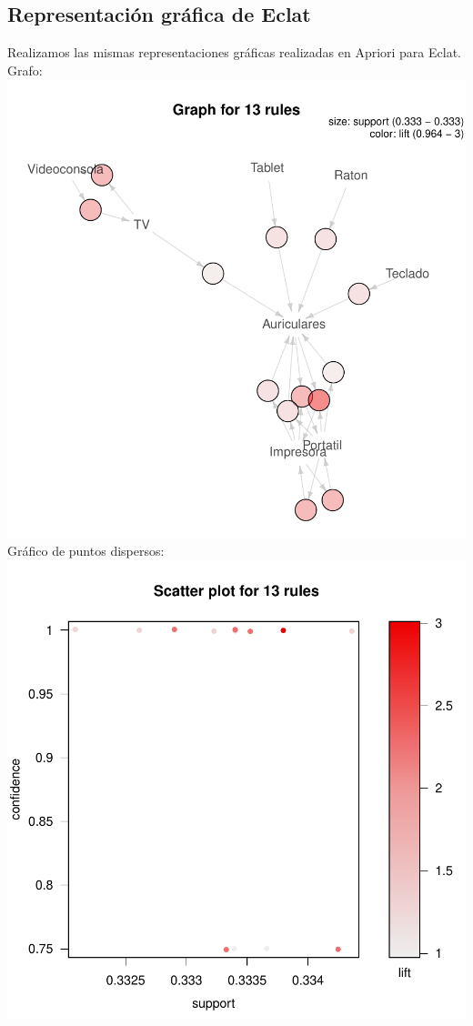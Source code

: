 \documentclass [a4paper] {article}
\begin{document}
\subsection{Representación gráfica de Eclat}
Realizamos las mismas representaciones gráficas realizadas en Apriori para Eclat.
Grafo:
\newline
\includegraphics{Memoria-Figura 11}
\newline
Gráfico de puntos dispersos:
\newline
\includegraphics{Memoria-Figura 12}
\newline
\end{document}

